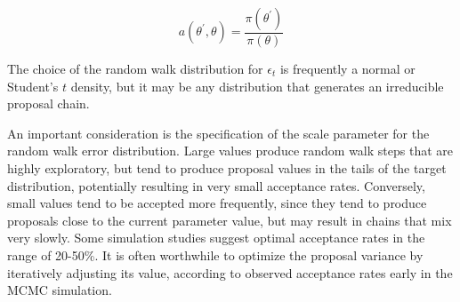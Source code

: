 \[
a(\theta^{\prime},\theta) = \frac{\pi(\theta^{\prime})}{\pi(\theta)}
\]

The choice of the random walk distribution for $\epsilon_t$ is frequently a normal or Student's $t$ density, but it may be any distribution that generates an irreducible proposal chain.

An important consideration is the specification of the scale parameter for the random walk error distribution. Large values produce random walk steps that are highly exploratory, but tend to produce proposal values in the tails of the target distribution, potentially resulting in very small acceptance rates. Conversely, small values tend to be accepted more frequently, since they tend to produce proposals close to the current parameter value, but may result in chains that mix very slowly. Some simulation studies suggest optimal acceptance rates in the range of 20-50\%. It is often worthwhile to optimize the proposal variance by iteratively adjusting its value, according to observed acceptance rates early in the MCMC simulation.
